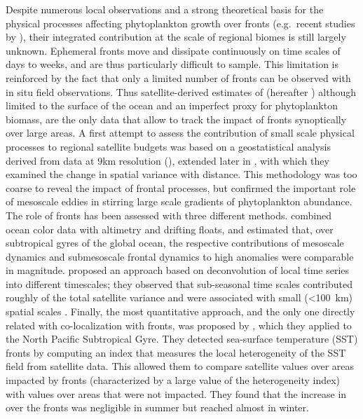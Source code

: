 Despite numerous local observations and a strong theoretical basis for the physical processes affecting phytoplankton growth over fronts (e.g.\ recent studies by \cite{marrec_2018, little_2018, verneil_2019, ruiz_2019, uchida_2020, kessouri_2020, tzortzis_2021}), their integrated contribution at the scale of regional biomes is still largely unknown.
Ephemeral fronts move and dissipate continuously on time scales of days to weeks, and are thus particularly difficult to sample.
This limitation is reinforced by the fact that only a limited number of fronts can be observed with in situ field observations.
Thus satellite-derived estimates of  (hereafter ) although limited to the surface of the ocean and an imperfect proxy for phytoplankton biomass, are the only data that allow to track the impact of fronts synoptically over large areas.
A first attempt to assess the contribution of small scale physical processes to regional satellite  budgets was based on a geostatistical analysis derived from data at 9km resolution (\cite{doney_2003}), extended later in \textcite{glover_2018}, with which they examined the change in spatial variance with distance.
This methodology was too coarse to reveal the impact of frontal processes, but confirmed the important role of mesoscale eddies in stirring large scale gradients of phytoplankton abundance.
The role of fronts has been assessed with three different methods.
\Textcite{guo_2019} combined ocean color data with altimetry and drifting floats, and estimated that, over subtropical gyres of the global ocean, the respective contributions of mesoscale dynamics and submesoscale frontal dynamics to high  anomalies were comparable in magnitude.
\Textcite{keerthi_2022} proposed an approach based on deconvolution of local  time series into different timescales; they observed that sub-seasonal time scales contributed roughly  of the total satellite  variance and were associated with small (\qty{<100}{\km}) spatial scales .
Finally, the most quantitative approach, and the only one directly related with co-localization with fronts, was proposed by \textcite{liu_2016}, which they applied to the North Pacific Subtropical Gyre.
They detected sea-surface temperature (SST) fronts by computing an index that measures the local heterogeneity of the SST field from satellite data.
This allowed them to compare satellite  values over areas impacted by fronts (characterized by a large value of the heterogeneity index) with values over areas that were not impacted.
They found that the increase in  over the fronts was negligible in summer but reached almost  in winter.

